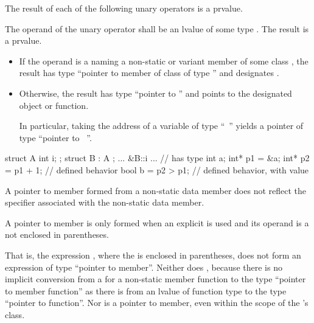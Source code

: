 \pnum
The result of each of the following unary operators is a prvalue.

\pnum
{}%
%
The operand of the unary \tcode{\&} operator
shall be an lvalue of some type .
The result is a prvalue.
\begin{itemize}
\item
If the operand is a  naming a non-static or variant member 
of some class , the result has type ``pointer to member
of class  of type '' and designates .
\item
Otherwise, the result has type ``pointer to '' and points to
the designated object or function.
\begin{note}
In particular, taking the address of a variable of type ``\cv{}~''
yields a pointer of type ``pointer to \cv{}~''.
\end{note}
\end{itemize}
\begin{example}
\begin{codeblock}
struct A { int i; };
struct B : A { };
... &B::i ...       // has type 
int a;
int* p1 = &a;
int* p2 = p1 + 1;   // defined behavior
bool b = p2 > p1;   // defined behavior, with value 
\end{codeblock}
\end{example}
\begin{note}
A pointer to member formed from a  non-static data
member does not reflect the  specifier
associated with the non-static data member.
\end{note}

\pnum
A pointer to member is only formed when an explicit \tcode{\&} is used
and its operand is a  not enclosed in
parentheses.
\begin{note}
That is, the expression , where the
 is enclosed in parentheses, does not form an
expression of type ``pointer to member''. Neither does
, because there is no implicit conversion from a
 for a non-static member function to the type
``pointer to member function'' as there is from an lvalue of function
type to the type ``pointer to function''. Nor is
 a pointer to member, even within the scope of
the 's class.
\end{note}

